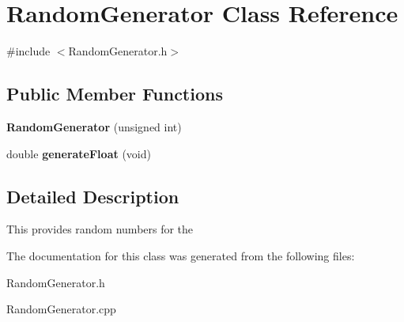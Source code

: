 \hypertarget{classRandomGenerator}{
\section{RandomGenerator Class Reference}
\label{classRandomGenerator}
}


{\ttfamily \#include $<$RandomGenerator.h$>$}\subsection*{Public Member Functions}
\begin{DoxyCompactItemize}
\item 
\hypertarget{classRandomGenerator_addcda615af9b184d61705dacd0cc0a9a}{
{\bfseries RandomGenerator} (unsigned int)}
\label{classRandomGenerator_addcda615af9b184d61705dacd0cc0a9a}

\item 
\hypertarget{classRandomGenerator_ae10cbb24c2728a4d8d441f2774ac8b99}{
double {\bfseries generateFloat} (void)}
\label{classRandomGenerator_ae10cbb24c2728a4d8d441f2774ac8b99}

\end{DoxyCompactItemize}


\subsection{Detailed Description}
This provides random numbers for the 

The documentation for this class was generated from the following files:\begin{DoxyCompactItemize}
\item 
RandomGenerator.h\item 
RandomGenerator.cpp\end{DoxyCompactItemize}
